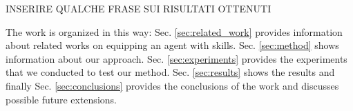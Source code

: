 INSERIRE QUALCHE FRASE SUI RISULTATI OTTENUTI

The work is organized in this way: Sec. \ref{sec:related_work} provides information about related works on equipping an agent with skills. Sec. \ref{sec:method} shows information about our approach. Sec. \ref{sec:experiments} provides the experiments that we conducted to test our method. Sec. \ref{sec:results} shows the results and finally Sec. \ref{sec:conclusions} provides the conclusions of the work and discusses possible future extensions.
